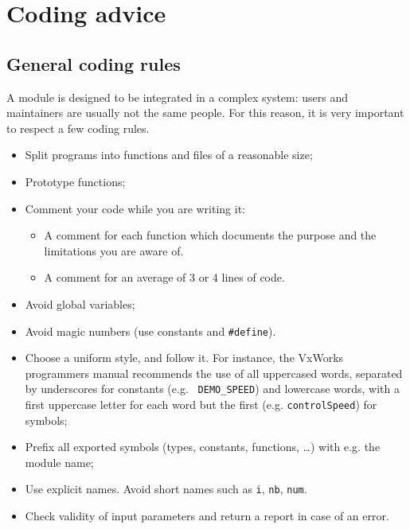\section{Coding advice}

\subsection{General coding rules}

A  module is designed  to be  integrated in a  complex system:  users and
maintainers are usually not the same people.  For this reason, it is very
important to respect a few coding rules.

\begin{itemize}
\item Split programs into functions and files of a reasonable size;

\item Prototype functions;

\item Comment your code while you are writing it: 
   \begin{itemize}
   \item A comment for each function which documents the purpose and the
	 limitations you are aware of.
   \item A comment for an average of 3 or 4 lines of code.
   \end{itemize}

\item Avoid global variables;

\item Avoid magic numbers (use constants and {\tt \#define}).

\item Choose a uniform style, and follow it. For instance, the VxWorks
      programmers manual recommends the use of 
all uppercased  words, separated by underscores  for constants (e.g. {\tt
DEMO\_SPEED}) and lowercase words, with a first uppercase letter for each
word but the first (e.g. {\tt controlSpeed}) for symbols;

\item Prefix all exported symbols (types, constants, functions, \ldots)
with e.g. the module name;

\item Use explicit names. Avoid short names such as {\tt i}, {\tt nb},
{\tt num}.

\item Check validity of input parameters and return a report in case of
an error.
\end{itemize}


